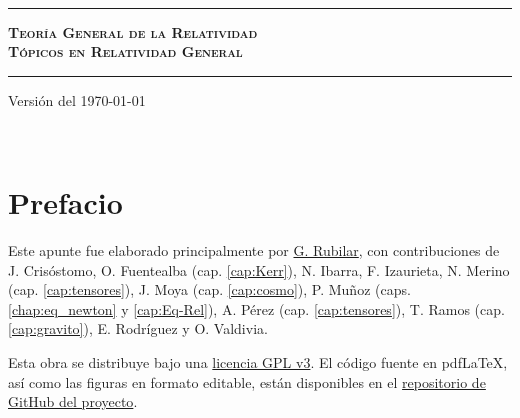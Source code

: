 \documentclass[letterpaper,11pt]{report}
\begin{document}
\sffamily

\thispagestyle{empty}
\begin{center}

    \

    \vspace{6.5cm}

    \rule{15cm}{0.1cm}

    \vspace{1.5cm}

    {\huge \textsc{\textbf{Teoría General de la Relatividad \\[0.6em] Tópicos en Relatividad General}}}

    \vspace{1.5cm}

    \rule{15cm}{0.1cm}

    \vspace{1.5cm}

    Versión del \today

\end{center}


\newpage
\thispagestyle{empty}
\ \\
\newpage
\setcounter{page}{1}

\pagestyle{plain}
\chapter*{Prefacio}
\bigskip
\bigskip
\bigskip
\bigskip
\bigskip
\bigskip



Este apunte fue elaborado principalmente por \href{https://gfrubi.github.io/}{G. Rubilar}, con contribuciones de J. Crisóstomo, O. Fuentealba (cap. \ref{cap:Kerr}), N. Ibarra, F. Izaurieta, N. Merino (cap. \ref{cap:tensores}), J. Moya (cap. \ref{cap:cosmo}), P. Muñoz (caps. \ref{chap:eq_newton} y \ref{cap:Eq-Rel}), A. Pérez (cap. \ref{cap:tensores}), T. Ramos (cap. \ref{cap:gravito}), E. Rodríguez y O. Valdivia.


\bigskip
\bigskip
\bigskip
\bigskip
\bigskip
\bigskip


Esta obra se distribuye bajo una \href{https://github.com/gfrubi/RG/blob/master/LICENSE}{licencia GPL v3}. El código fuente en pdf\LaTeX, así como las figuras en formato editable, están disponibles en el \href{https://github.com/gfrubi/RG}{repositorio de GitHub del proyecto}.


\bigskip
\bigskip
\bigskip

\bigskip
\bigskip
\bigskip
\end{document}
